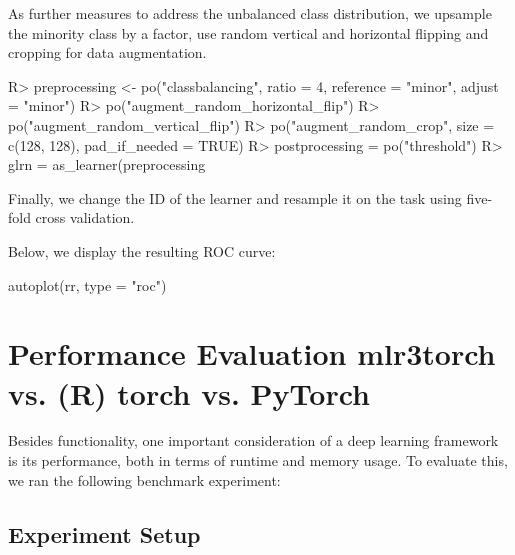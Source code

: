 \documentclass[article, nojss]{jss}
\theoremstyle{definition}
\begin{document}
As further measures to address the unbalanced class distribution, we upsample the minority class by a factor, use random vertical and horizontal flipping and cropping for data augmentation.

\begin{CodeInput}
R> preprocessing <- po("classbalancing", ratio = 4, reference = "minor",
  adjust = "minor") %
R>   po("augment_random_horizontal_flip") %
R>   po("augment_random_vertical_flip") %
R>   po("augment_random_crop", size = c(128, 128), pad_if_needed = TRUE)
R> postprocessing = po("threshold")
R> glrn = as_learner(preprocessing %
\end{CodeInput}

Finally, we change the ID of the learner and resample it on the task using five-fold cross validation.


Below, we display the resulting ROC curve:

\begin{CodeInput}
autoplot(rr, type = "roc")
\end{CodeInput}




\section{Performance Evaluation mlr3torch vs. (R) torch vs. PyTorch}\label{sec:benchmarks}

Besides functionality, one important consideration of a deep learning framework is its performance, both in terms of runtime and memory usage.
To evaluate this, we ran the following benchmark experiment:


\subsection*{Experiment Setup}
\end{document}
